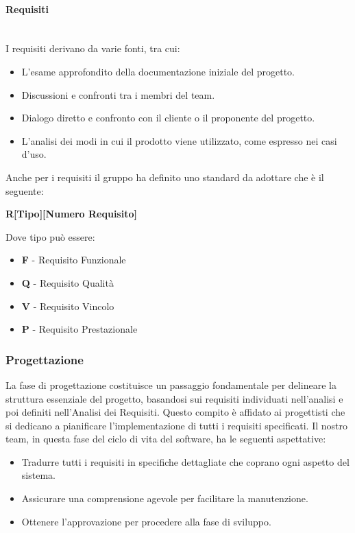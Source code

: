 \documentclass{article}
\begin{document}
\paragraph{Requisiti}~\\
I requisiti derivano da varie fonti, tra cui:

\begin{itemize}
    \item L'esame approfondito della documentazione iniziale del progetto.
    \item Discussioni e confronti tra i membri del team.
    \item Dialogo diretto e confronto con il cliente o il proponente del progetto.
    \item L'analisi dei modi in cui il prodotto viene utilizzato, come espresso nei casi d'uso.
\end{itemize}
Anche per i requisiti il gruppo ha definito uno standard da adottare che è il seguente:
\begin{center}
    \textbf{R[Tipo][Numero Requisito]}
\end{center}
Dove tipo può essere: 
\begin{itemize}
    \item \textbf{F} - Requisito Funzionale
    \item \textbf{Q} - Requisito Qualità
    \item \textbf{V} - Requisito Vincolo
    \item \textbf{P} - Requisito Prestazionale
\end{itemize}
\subsubsection{Progettazione}
La fase di progettazione costituisce un passaggio fondamentale per delineare la struttura essenziale del progetto, basandosi sui requisiti individuati nell'analisi e poi definiti nell'Analisi dei Requisiti. Questo compito è affidato ai progettisti che si dedicano a pianificare l'implementazione di tutti i requisiti specificati. Il nostro team, in questa fase del ciclo di vita del software, ha le seguenti aspettative:

\begin{itemize}
    \item Tradurre tutti i requisiti in specifiche dettagliate che coprano ogni aspetto del sistema.
    \item Assicurare una comprensione agevole per facilitare la manutenzione.
    \item Ottenere l'approvazione per procedere alla fase di sviluppo.
\end{itemize}
\end{document}
